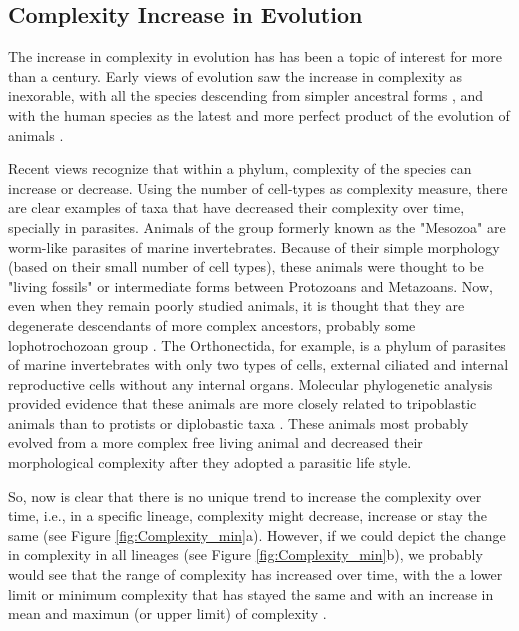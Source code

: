 \subsection{Complexity Increase in Evolution}

The increase in complexity in evolution has has been a topic of interest for more than a century.
Early views of evolution saw the increase in complexity as inexorable, with all the species descending from simpler ancestral forms \citep{lamarck1809zoo,haeckel1874menschen}, and with the human species as the latest and more perfect product of the evolution of animals \citep{haeckel1874menschen}.


Recent views recognize that within a phylum, complexity of the species can increase or decrease.
Using the number of cell-types as complexity measure, there are clear examples of taxa that have decreased their complexity over time, specially in parasites.
Animals of the group formerly known as the "Mesozoa" are worm-like parasites of marine invertebrates.
Because of their simple morphology (based on their small number of cell types), these animals were thought to be "living fossils" or intermediate forms between Protozoans and Metazoans.
Now, even when they remain poorly studied animals, it is thought that they are degenerate descendants of more complex ancestors, probably some lophotrochozoan group \citep{Arthur2010}.
The Orthonectida, for example, is a phylum of parasites of marine invertebrates with only two types of cells, external ciliated and internal reproductive cells without any internal organs. 
Molecular phylogenetic analysis provided evidence that these animals are more closely related to tripoblastic animals than to protists or diplobastic taxa \citep{Hanelt1996}.
These animals most probably evolved from a more complex free living animal and decreased their morphological complexity after they adopted a parasitic life style.

So, now is clear that there is no unique trend to increase the complexity over time, i.e., in a specific lineage, complexity might decrease, increase or stay the same (see Figure \ref{fig:Complexity_min}a).
However, if we could depict the change in complexity in all lineages (see Figure \ref{fig:Complexity_min}b), we probably would see that the range of complexity has increased over time, with the a lower limit or minimum complexity that has stayed the same and with an increase in mean and maximun (or upper limit) of complexity \citep{McShea1996,Arthur2010}.

